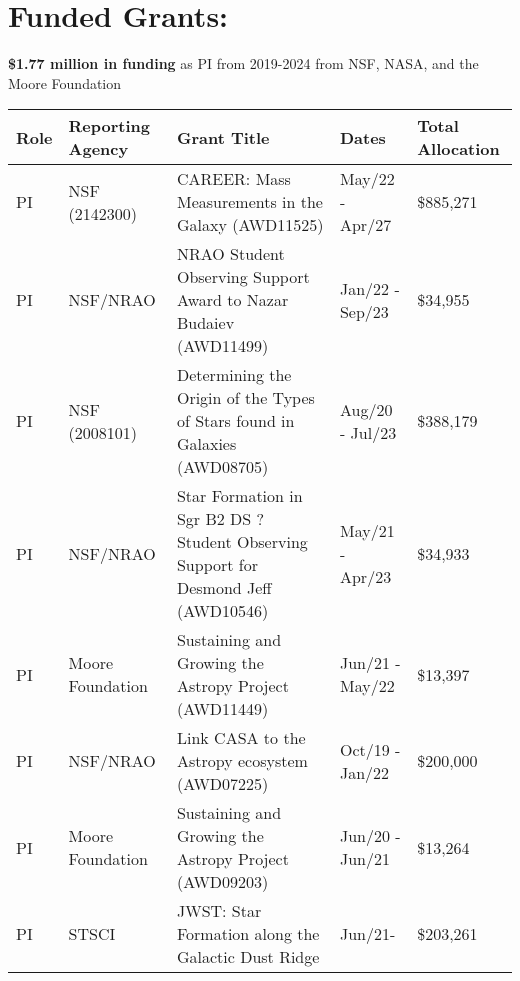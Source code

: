 \begin{minipage}{\textwidth}
\section*{Funded Grants: }


    \textbf{\$1.77 million in funding} as PI from 2019-2024 from NSF, NASA, and the Moore Foundation \\

\begin{tabular}{lp{1.0in}p{2.5in}p{0.6in}p{0.6in}}
Role & Reporting Agency & Grant Title & Dates & Total \mbox{Allocation}  \\
\hline
PI & NSF (2142300) & CAREER: Mass Measurements in the Galaxy (AWD11525) & May/22 - Apr/27 & \$885,271  \\
PI & NSF/NRAO & NRAO Student Observing Support Award to Nazar Budaiev (AWD11499) & Jan/22 - Sep/23 & \$34,955  \\
PI & NSF (2008101) & Determining the Origin of the Types of Stars found in Galaxies (AWD08705) & Aug/20 - Jul/23 & \$388,179  \\
PI & NSF/NRAO & Star Formation in Sgr B2 DS ? Student Observing Support for Desmond Jeff (AWD10546) & May/21 - Apr/23 & \$34,933   \\
PI & Moore Foundation & Sustaining and Growing the Astropy Project (AWD11449) & Jun/21 - May/22 & \$13,397   \\
PI & NSF/NRAO & Link CASA to the Astropy ecosystem (AWD07225) & Oct/19 - Jan/22 & \$200,000   \\
PI & Moore Foundation & Sustaining and Growing the Astropy Project (AWD09203) & Jun/20 - Jun/21 & \$13,264   \\
PI & STSCI & JWST: Star Formation along the Galactic Dust Ridge & Jun/21- &  \$203,261 \\
\end{tabular}
\end{minipage}
\vspace{4mm}
